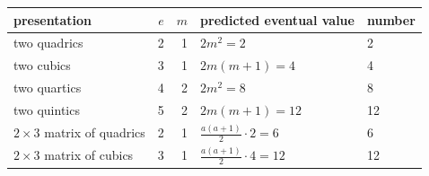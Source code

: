 \begin{tabular}{@{}lrrll@{}}
\toprule
presentation & $e$ & $m$ & predicted eventual value & number\\
\midrule
two quadrics & 2 & 1 & $2m^2=2$ & 2\\
two cubics & 3 & 1 & $2m(m+1)=4$ & 4\\
two quartics & 4 & 2 & $2m^2=8$ & 8\\
two quintics & 5 & 2 & $2m(m+1)=12$ & 12\\
$2\times3$ matrix of quadrics & 2 & 1 & $\tfrac{a(a+1)}{2}\cdot2=6$ & 6\\
$2\times3$ matrix of cubics & 3 & 1 & $\tfrac{a(a+1)}{2}\cdot4=12$ & 12\\
\bottomrule
\end{tabular}
